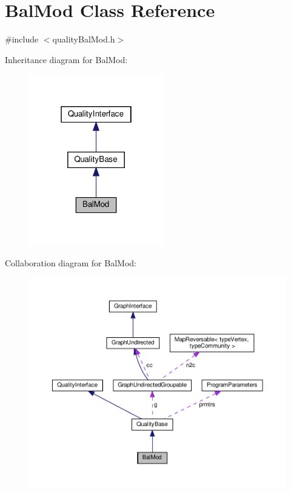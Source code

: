 \hypertarget{classBalMod}{}\section{Bal\+Mod Class Reference}
\label{classBalMod}


{\ttfamily \#include $<$quality\+Bal\+Mod.\+h$>$}



Inheritance diagram for Bal\+Mod\+:
\nopagebreak
\begin{figure}[H]
\begin{center}
\leavevmode
\includegraphics[width=166pt]{classBalMod__inherit__graph}
\end{center}
\end{figure}


Collaboration diagram for Bal\+Mod\+:
\nopagebreak
\begin{figure}[H]
\begin{center}
\leavevmode
\includegraphics[width=350pt]{classBalMod__coll__graph}
\end{center}
\end{figure}

